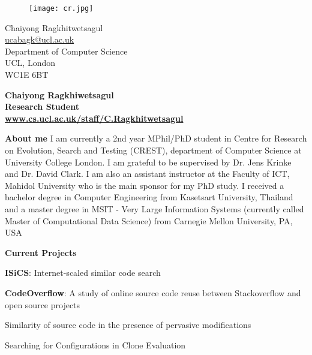 \documentclass[a4paper,12pt,final]{memoir}
\newcommand{\Sep}{\vspace{1.5em}}
\newcommand{\SmallSep}{\vspace{0.5em}}
\newenvironment{AboutMe}
	{\ignorespaces\textbf{\color{RoyalBlue} About me}}
	{\Sep\ignorespacesafterend}
\newcommand{\CVSection}[1]
	{\Large\textbf{#1}\par
	\SmallSep\normalsize\normalfont}
\newcommand{\CVItem}[1]
	{\textbf{\color{RoyalBlue} #1}}
\begin{document}
%
\begin{figure}
	\hfill
	\texttt{[image: cr.jpg]}
	\vspace{-6.5cm}
\end{figure}

\begin{flushright}\small
	Chaiyong Ragkhitwetsagul \\
	\url{ucabagk@ucl.ac.uk}  \\
    Department of Computer Science\\
    UCL, London\\
    WC1E 6BT

\end{flushright}\normalsize
\framebreak


\Huge\bfseries {\color{RoyalBlue} Chaiyong Ragkhiwetsagul} \\
\Large\bfseries  Research Student \\
\small \url{www.cs.ucl.ac.uk/staff/C.Ragkhitwetsagul} \\

\normalsize\normalfont

\begin{AboutMe}
I am currently a 2nd year MPhil/PhD student 
in Centre for Research on Evolution, Search and Testing (CREST), department of Computer Science at University College London. I am grateful to be supervised by Dr. Jens Krinke and Dr. David Clark.
\newline \newline
I am also an assistant instructor at the Faculty of ICT, Mahidol University who is the main sponsor for my PhD study.
\newline \newline
I received a bachelor degree in Computer Engineering from Kasetsart University, Thailand and a master degree in MSIT - Very Large Information Systems (currently called Master of Computational Data Science) from Carnegie Mellon University, PA, USA
\end{AboutMe}

\CVSection{Current Projects}
\begin{compactitem}[\color{RoyalBlue}$\circ$]
	\item \CVItem{ISiCS}: Internet-scaled similar code search
	\item \CVItem{CodeOverflow}: A study of online source code reuse between Stackoverflow and open source projects
	\item Similarity of source code in the presence of pervasive modifications
	\item Searching for Configurations in Clone Evaluation
\end{compactitem}
\SmallSep
\end{document}
